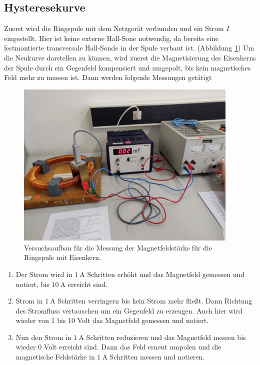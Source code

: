 \subsection{Hysteresekurve}
Zuerst wird die Ringspule mit dem Netzgerät verbunden und ein Strom $I$ eingestellt. Hier ist keine externe Hall-Sone notwendig,
da bereits eine festmontierte transversale Hall-Sonde in der Spule verbaut ist. (Abbildung \ref{fig:hysterese}) 
Um die Neukurve darstellen zu können, wird zuerst die Magnetisierung des Eisenkerns der Spule durch ein Gegenfeld
kompensiert und umgepolt, bis kein magnetisches Feld mehr zu messen ist. Dann werden folgende Messungen getätigt
\begin{figure}
    \centering
    \includegraphics[height=8cm]{content/ring.jpg}
    \caption{Versuchsaufbau für die Messung der Magnetfeldstärke für die Ringspule mit Eisenkern.}
    \label{fig:hysterese}
\end{figure}
\begin{enumerate}
    \item Der Strom wird in $\SI{1}{\ampere}$ Schritten erhöht und das Magnetfeld gemessen und notiert, bis $\SI{10}{\ampere}$ erreicht sind.
    \item Strom in $\SI{1}{\ampere}$ Schritten verringern bis kein Strom mehr fließt. Dann Richtung
    des Stromfluss vertauschen um ein Gegenfeld zu erzeugen. Auch hier wird wieder von 1 bis 10 Volt das Magnetfeld gemessen und notiert.
    \item Nun den Strom in $\SI{1}{\ampere}$ Schritten reduzieren und das Magnetfeld messen bis wieder 0 Volt erreicht sind. Dann das Feld erneut umpolen
    und die magnetische Feldstärke in $\SI{1}{\ampere}$ Schritten messen und notieren.
\end{enumerate}